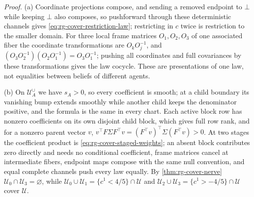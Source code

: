 \noindent\emph{Proof.}
(a) Coordinate projections compose, and sending a removed endpoint to \(\bot\)
while keeping \(\bot\) also composes, so pushforward through these deterministic
channels gives \eqref{eq:rg-cover-restriction-law}; restricting in \(c\) twice is
restriction to the smaller domain. For three local frame matrices
\(O_1,O_2,O_3\) of one associated fiber the coordinate transformations are
\(O_kO_j^{-1}\), and \((O_3O_2^{-1})(O_2O_1^{-1})=O_3O_1^{-1}\); pushing all
coordinates and full covariances by these transformations gives the law cocycle.
These are presentations of one law, not equalities between beliefs of different
agents.

(b) On \(\mathcal U_A^{\cup}\) we have \(s_A>0\), so every coefficient is smooth;
at a child boundary its vanishing bump extends smoothly while another child keeps
the denominator positive, and the formula is the same in every chart. Each active
block row has nonzero coefficients on its own disjoint child block, which gives
full row rank, and for a nonzero parent vector \(v\),
\(v^\top F\Sigma F^\top v=(F^\top v)^\top\Sigma(F^\top v)>0\). At two stages the
coefficient product is \eqref{eq:rg-cover-staged-weights}; an absent block
contributes zero directly and needs no conditional coefficient, frame matrices
cancel at intermediate fibers, endpoint maps compose with the same null
convention, and equal complete channels push every law equally. By
\cref{thm:rg-cover-nerve} \(\mathcal U_0\cap\mathcal U_3=\varnothing\), while
\(\mathcal U_0\cup\mathcal U_1=\{c^1<4/5\}\cap\mathcal U\) and
\(\mathcal U_2\cup\mathcal U_3=\{c^1>-4/5\}\cap\mathcal U\) cover \(\mathcal U\).

